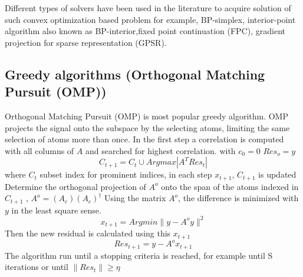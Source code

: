 Different types of solvers have been used in the literature to acquire solution of such convex optimization based problem for example, BP-simplex, interior-point algorithm also known as BP-interior,fixed point continuation (FPC), gradient projection for sparse representation (GPSR).

\subsection{Greedy algorithms (Orthogonal Matching Pursuit (OMP))}
Orthogonal Matching Pursuit (OMP) is most popular greedy algorithm.
OMP projects the signal onto the subspace by the selecting atoms, limiting the same selection of atoms more than once.
In the first step a correlation is computed with all columns of $A$ and searched for highest correlation.  
 with $c_0=0$  $Res_o=y$
\begin{equation} \label{firstmax}
C_{t+1}= C_t \cup Arg max |A^T Res_t |
\end{equation}
where $C_t$ subset index for prominent indices, in each step $x_{t+1}$, $C_{t+1}$ is updated
Determine the orthogonal projection of $A^o$ onto
the span of the atoms indexed in $C_{t+1}$   ,
$A^o=(A_c)(A_c)^{\dagger}$
Using the matrix $A^o$, the difference is minimized with $y$ in the least square sense.
\begin{equation} \label{firstmin}
x_{t+1}=Arg min\|y -A^o y \|^2
\end{equation}
 Then the new residual is calculated using this $x_{t+1}$
 \begin{equation} 
Res_{t+1}=y -A^o x_{t+1}
\end{equation}
The algorithm run until a stopping criteria is reached, for example until S iterations or until $\|Res_t\| \ge \eta$

